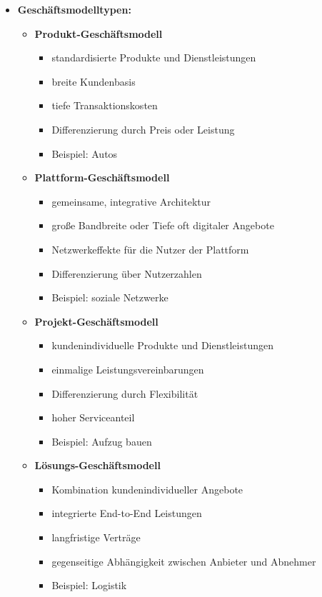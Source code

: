 \documentclass[12pt,a4paper]{article}
\begin{document}
\begin{itemize}
   \newpage
   \item \textbf{Geschäftsmodelltypen:}
         \begin{itemize}
            \item \textbf{Produkt-Geschäftsmodell}
                  \begin{itemize}
                     \item standardisierte Produkte und Dienstleistungen
                     \item breite Kundenbasis
                     \item tiefe Transaktionskosten
                     \item Differenzierung durch Preis oder Leistung
                     \item Beispiel: Autos
                  \end{itemize}
            \item \textbf{Plattform-Geschäftsmodell}
                  \begin{itemize}
                     \item gemeinsame, integrative Architektur 
                     \item große Bandbreite oder Tiefe oft digitaler Angebote
                     \item Netzwerkeffekte für die Nutzer der Plattform
                     \item Differenzierung über Nutzerzahlen
                     \item Beispiel: soziale Netzwerke
                  \end{itemize}
            \item \textbf{Projekt-Geschäftsmodell}
                  \begin{itemize}
                     \item kundenindividuelle Produkte und Dienstleistungen
                     \item einmalige Leistungsvereinbarungen
                     \item Differenzierung durch Flexibilität
                     \item hoher Serviceanteil
                     \item Beispiel: Aufzug bauen
                  \end{itemize}
            \item \textbf{Lösungs-Geschäftsmodell}
                  \begin{itemize}
                     \item Kombination kundenindividueller Angebote
                     \item integrierte End-to-End Leistungen
                     \item langfristige Verträge
                     \item gegenseitige Abhängigkeit zwischen Anbieter und Abnehmer
                     \item Beispiel: Logistik
                  \end{itemize}
         \end{itemize}


\end{itemize}
\end{document}
